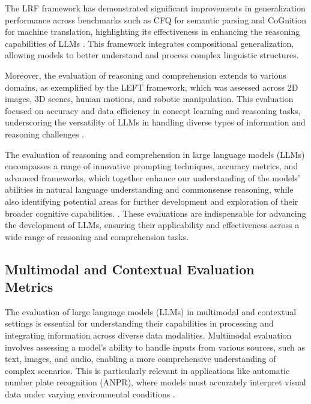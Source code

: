 The LRF framework has demonstrated significant improvements in generalization performance across benchmarks such as CFQ for semantic parsing and CoGnition for machine translation, highlighting its effectiveness in enhancing the reasoning capabilities of LLMs \cite{zheng2023layerwiserepresentationfusioncompositional}. This framework integrates compositional generalization, allowing models to better understand and process complex linguistic structures.



Moreover, the evaluation of reasoning and comprehension extends to various domains, as exemplified by the LEFT framework, which was assessed across 2D images, 3D scenes, human motions, and robotic manipulation. This evaluation focused on accuracy and data efficiency in concept learning and reasoning tasks, underscoring the versatility of LLMs in handling diverse types of information and reasoning challenges \cite{hsu2023whatsleftconceptgrounding}.



The evaluation of reasoning and comprehension in large language models (LLMs) encompasses a range of innovative prompting techniques, accuracy metrics, and advanced frameworks, which together enhance our understanding of the models' abilities in natural language understanding and commonsense reasoning, while also identifying potential areas for further development and exploration of their broader cognitive capabilities. \cite{hsu2023whatsleftconceptgrounding,kojima2022large}. These evaluations are indispensable for advancing the development of LLMs, ensuring their applicability and effectiveness across a wide range of reasoning and comprehension tasks.



\subsection{Multimodal and Contextual Evaluation Metrics} \label{subsec:Multimodal and Contextual Evaluation Metrics}



The evaluation of large language models (LLMs) in multimodal and contextual settings is essential for understanding their capabilities in processing and integrating information across diverse data modalities. Multimodal evaluation involves assessing a model's ability to handle inputs from various sources, such as text, images, and audio, enabling a more comprehensive understanding of complex scenarios. This is particularly relevant in applications like automatic number plate recognition (ANPR), where models must accurately interpret visual data under varying environmental conditions \cite{adak2022automaticnumberplaterecognition}.



